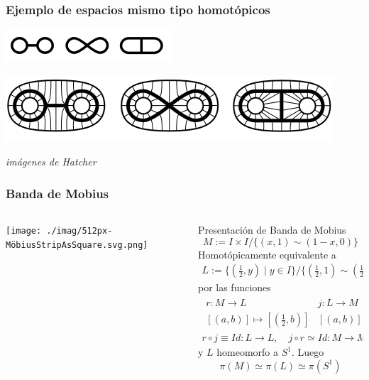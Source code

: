 \documentclass[xetex,mathserif,serif]{beamer}
\begin{document}
  \begin{frame}
    \frametitle{Ejemplo de espacios mismo tipo homotópicos}
    \begin{block}{}
      \centering
      \includegraphics{./imag/ThreeNonHomeoButHomotopyEquivGraphs.png}
    \end{block}

    \begin{block}{}
      \centering
      \includegraphics[scale=0.5]{./imag/HomotopyEquivalentsToBiAnnulus.png}
    \end{block}
    \begin{center}
      \emph{imágenes de Hatcher}
    \end{center}

  \end{frame}

  \begin{frame}
    \frametitle{Banda de Mobius}
    \begin{columns}
      \begin{column}{0.3\textwidth}
        \begin{center}
          \texttt{[image: ./imag/512px-MöbiusStripAsSquare.svg.png]}
        \end{center}
      \end{column}
      \begin{column}{0.7\textwidth}
        Presentación de Banda de Mobius
        \[ M := I \times I / \{(x,1) \sim (1 - x, 0)\}\]
        \pause
        Homotópicamente equivalente a
        \begin{gather*}
          L := \{ \left(\frac 1 2, y \right) \mid y \in I \} / \{ \left(
                \frac 1 2 , 1 \right) \sim \left( \frac 1 2, 0 \right)\}
        \end{gather*}
        por las funciones
        \begin{gather*}
          \begin{matrix}
            r : M \to L & j : L \to M \\
            [(a,b)] \mapsto [(\frac 1 2 , b)] & [(a,b)] \mapsto [(a,b)]
          \end{matrix} \\
          r \circ j \equiv Id : L \to L, \quad j \circ r \simeq Id : M \to M
        \end{gather*}
      y \(L\) homeomorfo a \(S^1\). Luego
      \[ \pi (M) \simeq \pi (L) \simeq \pi (S^1) \]
      \end{column}
    \end{columns}
  \end{frame}
\end{document}
